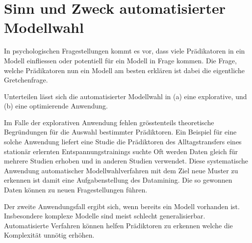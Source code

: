 \section{Sinn und Zweck automatisierter Modellwahl}
In psychologischen Fragestellungen kommt es vor, dass viele Prädikatoren in ein Modell einfliessen oder potentiell für ein Modell in Frage kommen.
Die Frage, welche Prädikatoren nun ein Modell am besten erklären ist dabei die eigentliche Gretchenfrage. 

Unterteilen lässt sich die automatisierter Modellwahl in (a) eine explorative, und (b) eine optimierende Anwendung. 

Im Falle der explorativen Anwendung fehlen grösstenteils theoretische Begründungen für die Auswahl bestimmter Prädiktoren. Ein Beispiel für eine solche Anwendung liefert eine Studie die Prädiktoren des Alltagstransfers eines stationär erlernten Entspannungstrainings suchte \cite{023755520080101}
Oft werden Daten gleich für mehrere Studien erhoben und in anderen Studien verwendet.
Diese systematische Anwendung automatischer Modellwahlverfahren mit dem Ziel neue Muster zu erkennen ist damit eine Aufgabenstellung des Datamining. 
Die so gewonnen Daten können zu neuen Fragestellungen führen. 

Der zweite Anwendungsfall ergibt sich, wenn bereits ein Modell vorhanden ist. Insbesondere komplexe Modelle sind meist schlecht generalisierbar. Automatisierte Verfahren können  helfen Prädiktoren zu erkennen welche die Komplexität unnötig erhöhen.